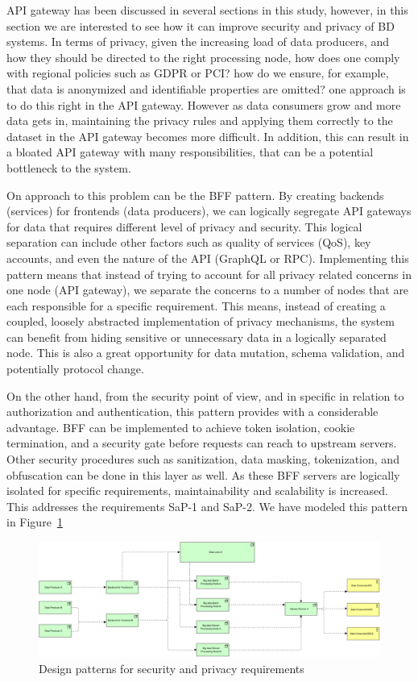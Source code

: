 \documentclass{bmcart}
\begin{document}
API gateway has been discussed in several sections in this study, however, in this section we are interested to see how it can improve security and privacy of BD systems. In terms of privacy, given the increasing load of data producers, and how they should be directed to the right processing node, how does one comply with regional policies such as GDPR or PCI? how do we ensure, for example, that data is anonymized and identifiable properties are omitted? one approach is to do this right in the API gateway. However as data consumers grow and more data gets in, maintaining the privacy rules and applying them correctly to the dataset in the API gateway becomes more difficult. In addition, this can result in a bloated API gateway with many responsibilities, that can be a potential bottleneck to the system.

On approach to this problem can be the BFF pattern. By creating backends (services) for frontends (data producers), we can logically segregate API gateways for data that requires different level of privacy and security. This logical separation can include other factors such as quality of services (QoS), key accounts, and even the nature of the API (GraphQL or RPC). Implementing this pattern means that instead of trying to account for all privacy related concerns in one node (API gateway), we separate the concerns to a number of nodes that are each responsible for a specific requirement. This means, instead of creating a coupled, loosely abstracted implementation of privacy mechanisms, the system can benefit from hiding sensitive or unnecessary data in a logically separated node. This is also a great opportunity for data mutation, schema validation, and potentially protocol change.

On the other hand, from the security point of view, and in specific in relation to authorization and authentication, this pattern provides with a considerable advantage. BFF can be implemented to achieve token isolation, cookie termination, and a security gate before requests can reach to upstream servers. Other security procedures such as sanitization, data masking, tokenization, and obfuscation can be done in this layer as well. As these BFF servers are logically isolated for specific requirements, maintainability and scalability is increased. This addresses the requirements SaP-1 and SaP-2. We have modeled this pattern in Figure~\ref{fig:SaP Requirements}

\begin{figure}[h]
  \includegraphics[width=12cm]{Media/Privacy and Security Requirements.jpg}
  \caption[]{Design patterns for security and privacy requirements}
  \label{fig:SaP Requirements}
\end{figure}
\end{document}
